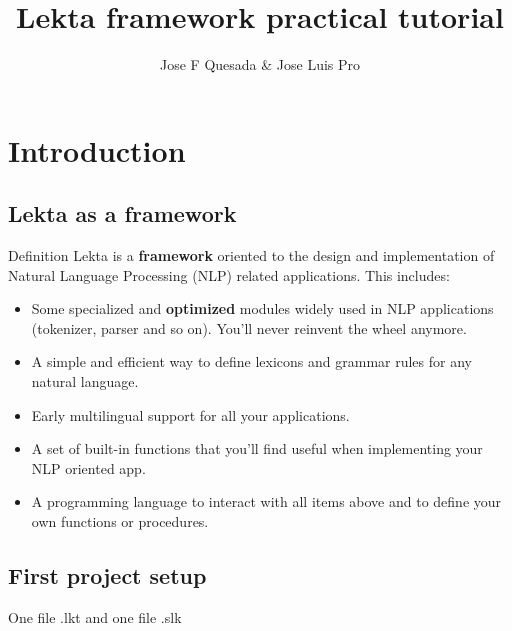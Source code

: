 \documentclass[11pt]{beamer}
\title[Lekta framework practical tutorial]{Lekta framework practical tutorial}
\author{Jose F Quesada \& Jose Luis Pro}
\date{}
\begin{document}
\begin{frame}
\titlepage
\end{frame}

\section{Introduction}

\subsection{Lekta as a framework}

\begin{frame}
	\begin{block}{Definition}
			Lekta is a \textbf{framework} oriented to the design and implementation of Natural Language Processing (NLP) related applications. This includes:
			\pause
			\begin{itemize}
				\item Some specialized and \textbf{optimized} modules widely used in NLP applications (tokenizer, parser and so on). You'll never reinvent the wheel anymore.
				\pause
				\item A simple and efficient way to define lexicons and grammar rules for any natural language.
				\pause
				\item Early multilingual support for all your applications.
				\pause
				\item A set of built-in functions that you'll find useful when implementing your NLP oriented app.
				\pause
				\item A programming language to interact with all items above and to define your own functions or procedures.
			\end{itemize}
	\end{block}
\end{frame}

\subsection{First project setup}

\begin{frame}
One file .lkt and one file .slk
\end{frame}
\end{document}
